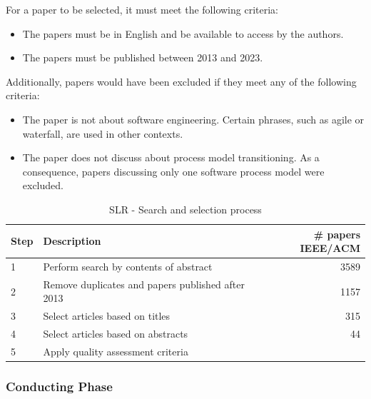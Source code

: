 \documentclass[conference]{IEEEtran}
\begin{document}
For a paper to be selected, it must meet the following criteria:
\begin{itemize}
\item The papers must be in English and be available to access by the authors.
\item The papers must be published between 2013 and 2023.
\end{itemize}
Additionally, papers would have been excluded if they meet any of the following criteria:
\begin{itemize}
\item The paper is not about software engineering. Certain phrases, such as agile or waterfall, are used in other contexts. %
\item The paper does not discuss about process model transitioning. As a consequence, papers discussing only one software process model were excluded.
\end{itemize}

\begin{table}[h!]
    \label{tab:SLRSteps}
    \caption{SLR - Search and selection process}
    \begin{tabular}{l p{4.4cm} r}
        \hline
         \textbf{Step} & \textbf{Description} & \textbf{\# papers IEEE/ACM} \\
         \hline
         1 & Perform search by contents of abstract & 3589\\
         2 & Remove duplicates and papers published after 2013 & 1157\\
         3 & Select articles based on titles & 315 \\
         4 & Select articles based on abstracts & 44 \\
         5 & Apply quality assessment criteria \\
         \hline
    \end{tabular}
\end{table}

\subsubsection{Conducting Phase}
\end{document}

